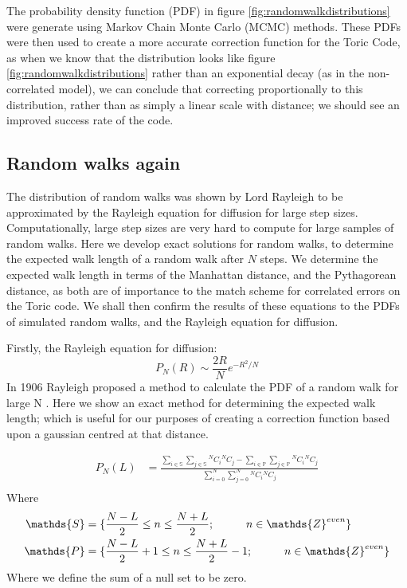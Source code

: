  	The probability density function (PDF) in figure \ref{fig:randomwalkdistributions} were generate using Markov Chain Monte Carlo (MCMC) methods. These PDFs were then used to create a more accurate correction function for the Toric Code, as when we know that the distribution looks like figure \ref{fig:randomwalkdistributions} rather than an exponential decay (as in the non-correlated model), we can conclude that correcting proportionally to this distribution, rather than as simply a linear scale with distance; we should see an improved success rate of the code. 
 
 \subsection{Random walks again}
The distribution of random walks was shown by Lord Rayleigh \cite{bibid} to be approximated by the Rayleigh equation for diffusion for large step sizes. Computationally, large step sizes are very hard to compute for large samples of random walks. Here we develop exact solutions for random walks, to determine the expected walk length of a random walk after $N$ steps. We determine the expected walk length in terms of the Manhattan distance, and the Pythagorean distance, as both are of importance to the match scheme for correlated errors on the Toric code. We shall then confirm the results of these equations to the PDFs of simulated random walks, and the Rayleigh equation for diffusion. 

Firstly, the Rayleigh equation for diffusion:
\begin{equation}
P_N(R) \sim \frac{2R}{N}e ^{-R^2/N}
\label{eq:rayleigh}
\end{equation}
In 1906 Rayleigh proposed a method to calculate the PDF of a random walk for large N \cite{Rayleigh1905}. Here we show an exact method for determining the expected walk length; which is useful for our purposes of creating a correction function based upon a gaussian centred at that distance.  

\begin{align}
P_N(L) & = \frac{\sum_{i\in \mathds{S}}\sum_{j\in \mathds{S}} {}^NC_i {}^NC_j - \sum_{i\in \mathds{P}}\sum_{j\in \mathds{P}} {}^NC_i {}^NC_j}
{\sum_{i = 0}^N\sum_{j=0}^N {}^NC_i {}^NC_j }\\
\label{eq:exactPDF}
\end{align}
Where 
\begin{align}
\centering
	\mathds{S} &= \{ \frac{N-L}{2} \leq n \leq \frac{N+L}{2};  \hspace{1cm} n\in \mathds{Z}^{even} \}\\
	\mathds{P} &= \{\frac{N-L}{2}+1 \leq n \leq \frac{N+L}{2}-1;  \hspace{1cm} n\in \mathds{Z}^{even}\}
\end{align}
Where we define the sum of a null set to be zero. 


